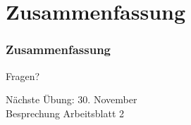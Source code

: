 \documentclass[c,18pt]{beamer}
\begin{document}
\setcounter{exercise}{1}


\setcounter{exercise}{2}


\setcounter{exercise}{3}

\setcounter{exercise}{3}



\def\kap{2}%


\section{Zusammenfassung}

\begin{frame}
  \frametitle{Zusammenfassung}%
\tableofcontents[hideallsubsections]
\end{frame}

\begin{frame}
\centering
\Huge\textcolor{KITgreen}{Fragen?}
\vspace{2cm}

{\LARGE
N\"achste \"Ubung: 30. November\\
Besprechung Arbeitsblatt 2
}
\end{frame}


\end{document}
